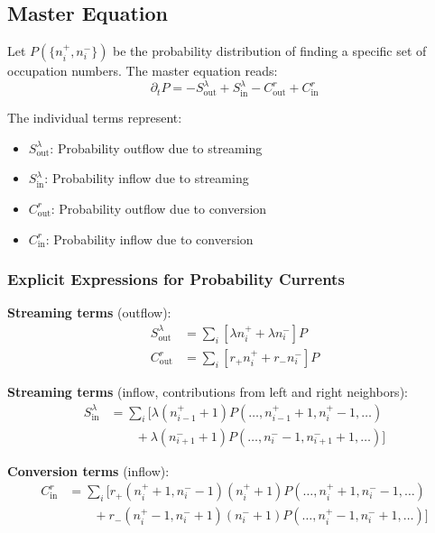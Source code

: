 \subsection{Master Equation}\label{subsec:master-eq}

Let $P(\{n_i^+, n_i^-\})$ be the probability distribution of finding a specific set of occupation numbers. The master equation reads:
\begin{equation}\label{eq:master-eq}
\partial_t P = -S^\lambda_{\text{out}} + S^\lambda_{\text{in}} - C^r_{\text{out}} + C^r_{\text{in}}
\end{equation}

The individual terms represent:
\begin{itemize}
    \item $S^\lambda_{\text{out}}$: Probability outflow due to streaming
    \item $S^\lambda_{\text{in}}$: Probability inflow due to streaming
    \item $C^r_{\text{out}}$: Probability outflow due to conversion
    \item $C^r_{\text{in}}$: Probability inflow due to conversion
\end{itemize}

\subsubsection{Explicit Expressions for Probability Currents}

\textbf{Streaming terms} (outflow):
\begin{align}
S^\lambda_{\text{out}} &= \sum_i \left[\lambda n_i^+ + \lambda n_i^-\right] P \label{eq:stream-out}\\
C^r_{\text{out}} &= \sum_i \left[r_+ n_i^+ + r_- n_i^-\right] P \label{eq:conv-out}
\end{align}

\textbf{Streaming terms} (inflow, contributions from left and right neighbors):
\begin{align}
S^\lambda_{\text{in}} &= \sum_i \Big[\lambda(n_{i-1}^+ + 1)P(\ldots, n_{i-1}^+ + 1, n_i^+ - 1, \ldots) \nonumber\\
&\qquad + \lambda(n_{i+1}^- + 1)P(\ldots, n_i^- - 1, n_{i+1}^- + 1, \ldots)\Big] \label{eq:stream-in}
\end{align}

\textbf{Conversion terms} (inflow):
\begin{align}
C^r_{\text{in}} &= \sum_i \Big[r_+(n_i^+ + 1, n_i^- - 1)(n_i^+ + 1)P(\ldots, n_i^+ + 1, n_i^- - 1, \ldots) \nonumber\\
&\qquad + r_-(n_i^+ - 1, n_i^- + 1)(n_i^- + 1)P(\ldots, n_i^+ - 1, n_i^- + 1, \ldots)\Big] \label{eq:conv-in}
\end{align}

